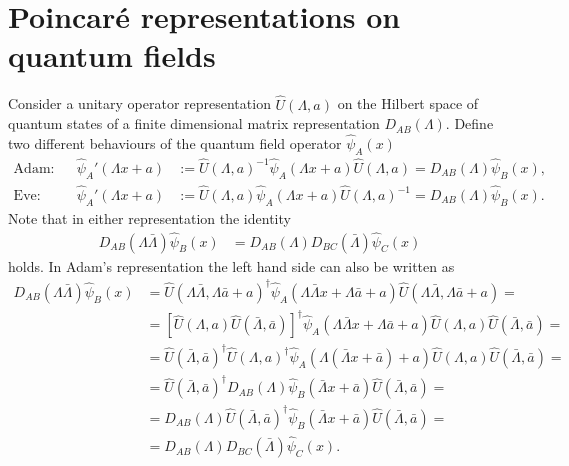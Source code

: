 \documentclass[english, parskip=full]{scrartcl}
\renewcommand{\braket}{}
\newcommand{\kla}{}
\newcommand{\klam}{}
\newcommand{\tecxt}{}
\newcommand{\Ket}{}
\renewcommand{\tilde}{\bar}
\begin{document}
\section{Poincar\'e representations on quantum fields}
Consider a unitary operator representation $\hat{U}(\Lambda, a)$ on the Hilbert space of quantum states of a finite dimensional matrix representation $D_{AB}(\Lambda)$.
Define two different behaviours of the quantum field operator $\hat{\psi}_A(x)$
\begin{align}
\tecxt\text{Adam:} && \hat{\psi}_A'(\Lambda x + a) &:= \hat{U}(\Lambda, a)^{-1} \hat{\psi}_A(\Lambda x + a) \hat{U}(\Lambda, a) = D_{AB}(\Lambda) \hat{\psi}_B(x),\\
\tecxt\text{Eve:} && \hat{\psi}_A'(\Lambda x + a) &:= \hat{U}(\Lambda, a) \hat{\psi}_A(\Lambda x + a) \hat{U}(\Lambda, a)^{-1} = D_{AB}(\Lambda) \hat{\psi}_B(x).
\end{align}
Note that in either representation the identity
\begin{align}
D_{AB}(\Lambda\bar{\Lambda}) \hat{\psi}_B(x) &= D_{AB}(\Lambda) D_{BC}(\bar{\Lambda}) \hat{\psi}_C(x) \label{eqn:D AB repr identity}
\end{align}
holds.
In Adam's representation the left hand side can also be written as
\begin{align}
D_{AB}(\Lambda\bar{\Lambda}) \hat{\psi}_B(x) &= \hat{U}(\Lambda\bar{\Lambda}, \Lambda \bar{a} + a)^\dagger \hat{\psi}_A(\Lambda\bar{\Lambda} x + \Lambda\bar{a} + a) \hat{U}(\Lambda\bar{\Lambda}, \Lambda \bar{a} + a) = \\
&= \klam\left[ \hat{U}(\Lambda, a) \hat{U}(\bar{\Lambda}, \bar{a}) \right]^\dagger \hat{\psi}_A(\Lambda\bar{\Lambda} x + \Lambda\bar{a} + a) \hat{U}(\Lambda, a) \hat{U}(\bar{\Lambda}, \bar{a}) = \\
&= \hat{U}(\bar{\Lambda}, \bar{a})^\dagger \hat{U}(\Lambda, a)^\dagger \hat{\psi}_A\kla\left( \Lambda (\bar{\Lambda} x + \bar{a}) + a \right) \hat{U}(\Lambda, a)  \hat{U}(\bar{\Lambda}, \bar{a}) = \\
&= \hat{U}(\bar{\Lambda}, \bar{a})^\dagger D_{AB}(\Lambda) \hat{\psi}_B\left( \bar{\Lambda} x + \bar{a} \right) \hat{U}(\bar{\Lambda}, \bar{a}) = \\
&= D_{AB}(\Lambda) \hat{U}(\bar{\Lambda}, \bar{a})^\dagger \hat{\psi}_B\left( \bar{\Lambda} x + \bar{a} \right) \hat{U}(\bar{\Lambda}, \bar{a}) = \\
&= D_{AB}(\Lambda) D_{BC}(\bar{\Lambda}) \hat{\psi}_C(x).
\end{align}
\end{document}
